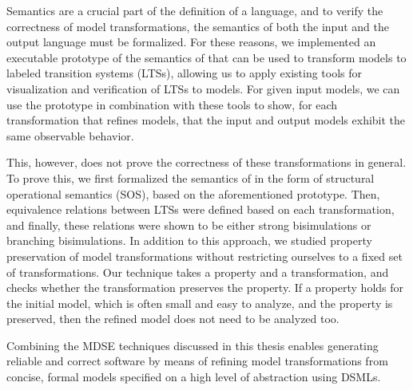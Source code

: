 Semantics are a crucial part of the definition of a language, and to verify the correctness of model transformations, the semantics of both the input and the output language must be formalized.
For these reasons, we implemented an executable prototype of the semantics of \SLCO that can be used to transform \SLCO models to labeled transition systems (LTSs), allowing us to apply existing tools for visualization and verification of LTSs to \SLCO models.
For given input models, we can use the prototype in combination with these tools to show, for each transformation that refines \SLCO models, that the input and output models exhibit the same observable behavior.

This, however, does not prove the correctness of these transformations in general.
To prove this, we first formalized the semantics of \SLCO in the form of structural operational semantics (SOS), based on the aforementioned prototype.
Then, equivalence relations between LTSs were defined based on each transformation, and finally, these relations were shown to be either strong bisimulations or branching bisimulations.
In addition to this approach, we studied property preservation of model transformations without restricting ourselves to a fixed set of transformations.
Our technique takes a property and a transformation, and checks whether the transformation preserves the property.
If a property holds for the initial model, which is often small and easy to analyze, and the property is preserved, then the refined model does not need to be analyzed too.

Combining the MDSE techniques discussed in this thesis enables generating reliable and correct software by means of refining model transformations from concise, formal models specified on a high level of abstraction using DSMLs.  